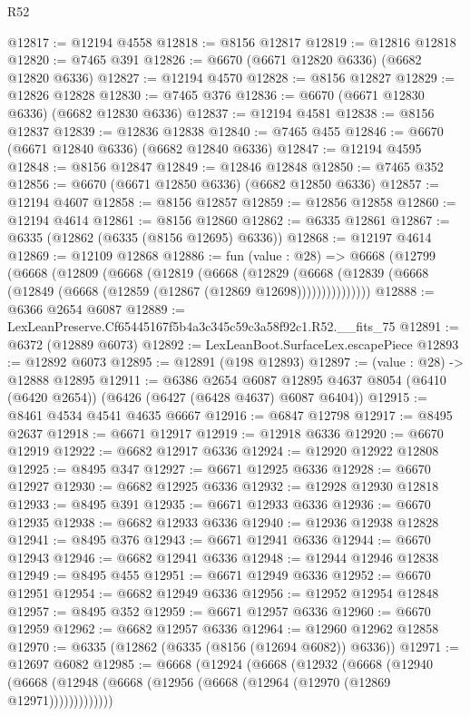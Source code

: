 \begin{lexlean}{R52}
\begin{coremodule}
@12817 := @12194 @4558
@12818 := @8156 @12817
@12819 := @12816 @12818
@12820 := @7465 @391
@12826 := @6670 (@6671 @12820 @6336) (@6682 @12820 @6336)
@12827 := @12194 @4570
@12828 := @8156 @12827
@12829 := @12826 @12828
@12830 := @7465 @376
@12836 := @6670 (@6671 @12830 @6336) (@6682 @12830 @6336)
@12837 := @12194 @4581
@12838 := @8156 @12837
@12839 := @12836 @12838
@12840 := @7465 @455
@12846 := @6670 (@6671 @12840 @6336) (@6682 @12840 @6336)
@12847 := @12194 @4595
@12848 := @8156 @12847
@12849 := @12846 @12848
@12850 := @7465 @352
@12856 := @6670 (@6671 @12850 @6336) (@6682 @12850 @6336)
@12857 := @12194 @4607
@12858 := @8156 @12857
@12859 := @12856 @12858
@12860 := @12194 @4614
@12861 := @8156 @12860
@12862 := @6335 @12861
@12867 := @6335 (@12862 (@6335 (@8156 @12695) @6336))
@12868 := @12197 @4614
@12869 := @12109 @12868
@12886 := fun (value : @28) =>
  @6668
    (@12799
      (@6668
        (@12809
          (@6668
            (@12819
              (@6668
                (@12829
                  (@6668 (@12839 (@6668 (@12849 (@6668 (@12859 (@12867 (@12869 @12698)))))))))))))))
@12888 := @6366 @2654 @6087
@12889 := LexLeanPreserve.Cf65445167f5b4a3c345c59c3a58f92c1.R52.__fits_75
@12891 := @6372 (@12889 @6073)
@12892 := LexLeanBoot.SurfaceLex.escapePiece
@12893 := @12892 @6073
@12895 := @12891 (@198 @12893)
@12897 := (value : @28) -> @12888 @12895
@12911 := @6386
    @2654
    @6087
    @12895
    @4637
    @8054
    (@6410 (@6420 @2654))
    (@6426 (@6427 (@6428 @4637) @6087 @6404))
@12915 := @8461 @4534 @4541 @4635 @6667
@12916 := @6847 @12798
@12917 := @8495 @2637
@12918 := @6671 @12917
@12919 := @12918 @6336
@12920 := @6670 @12919
@12922 := @6682 @12917 @6336
@12924 := @12920 @12922 @12808
@12925 := @8495 @347
@12927 := @6671 @12925 @6336
@12928 := @6670 @12927
@12930 := @6682 @12925 @6336
@12932 := @12928 @12930 @12818
@12933 := @8495 @391
@12935 := @6671 @12933 @6336
@12936 := @6670 @12935
@12938 := @6682 @12933 @6336
@12940 := @12936 @12938 @12828
@12941 := @8495 @376
@12943 := @6671 @12941 @6336
@12944 := @6670 @12943
@12946 := @6682 @12941 @6336
@12948 := @12944 @12946 @12838
@12949 := @8495 @455
@12951 := @6671 @12949 @6336
@12952 := @6670 @12951
@12954 := @6682 @12949 @6336
@12956 := @12952 @12954 @12848
@12957 := @8495 @352
@12959 := @6671 @12957 @6336
@12960 := @6670 @12959
@12962 := @6682 @12957 @6336
@12964 := @12960 @12962 @12858
@12970 := @6335 (@12862 (@6335 (@8156 (@12694 @6082)) @6336))
@12971 := @12697 @6082
@12985 := @6668
    (@12924
      (@6668
        (@12932
          (@6668
            (@12940 (@6668 (@12948 (@6668 (@12956 (@6668 (@12964 (@12970 (@12869 @12971)))))))))))))

\end{coremodule}
\end{lexlean}
